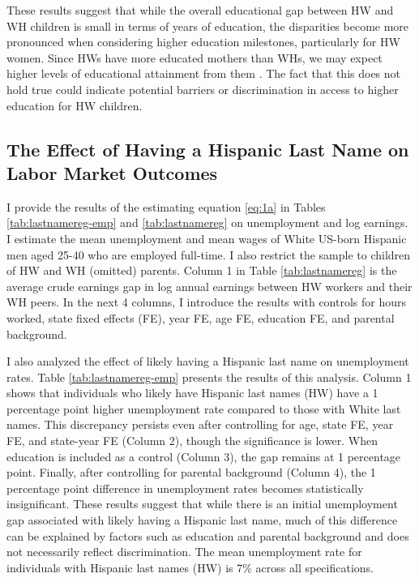 These results suggest that while the overall educational gap between HW and WH children is small in terms of years of education, the disparities become more pronounced when considering higher education milestones, particularly for HW women. Since HWs have more educated mothers than WHs, we may expect higher levels of educational attainment from them \autocite{kimball2009risk, gould2020does}. The fact that this does not hold true could indicate potential barriers or discrimination in access to higher education for HW children.

\subsection{The Effect of Having a Hispanic Last Name on Labor Market Outcomes}

I provide the results of the estimating equation \ref{eq:1a} in Tables \ref{tab:lastnamereg-emp} and \ref{tab:lastnamereg} on unemployment and log earnings. I estimate the mean unemployment and mean wages of White US-born Hispanic men aged 25-40 who are employed full-time. I also restrict the sample to children of HW and WH (omitted) parents.  Column 1 in Table \ref{tab:lastnamereg} is the average crude earnings gap in log annual earnings between HW workers and their WH peers. In the next 4 columns, I introduce the results with controls for hours worked, state fixed effects (FE), year FE, age FE, education FE, and parental background.

I also analyzed the effect of likely having a Hispanic last name on unemployment rates. Table \ref{tab:lastnamereg-emp} presents the results of this analysis. Column 1 shows that individuals who likely have Hispanic last names (HW) have a 1 percentage point higher unemployment rate compared to those with White last names. This discrepancy persists even after controlling for age, state FE, year FE, and state-year FE (Column 2), though the significance is lower. When education is included as a control (Column 3), the gap remains at 1 percentage point. Finally, after controlling for parental background (Column 4), the 1 percentage point difference in unemployment rates becomes statistically insignificant. These results suggest that while there is an initial unemployment gap associated with likely having a Hispanic last name, much of this difference can be explained by factors such as education and parental background and does not necessarily reflect discrimination. The mean unemployment rate for individuals with Hispanic last names (HW) is 7\% across all specifications.

